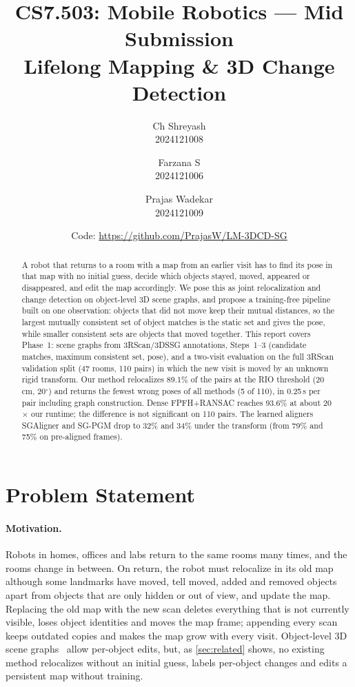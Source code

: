 \documentclass[11pt, a4paper]{article}
\title{
  \large\textnormal{CS7.503: Mobile Robotics --- Mid Submission}\\[0.5em]
  \LARGE\textbf{\color{darkblue}Lifelong Mapping \& 3D Change Detection}
}
\author{
  Ch Shreyash \\ 2024121008
  \and
  Farzana S \\ 2024121006
  \and
  Prajas Wadekar \\ 2024121009
}
\date{\small Code: \url{https://github.com/PrajasW/LM-3DCD-SG}}
\begin{document}
\maketitle

\begin{abstract}
  \noindent A robot that returns to a room with a map from an earlier visit has to find its pose in that map with no
  initial guess, decide which objects stayed, moved, appeared or disappeared, and edit the map accordingly. We pose this
  as joint relocalization and change detection on object-level 3D scene graphs, and propose a training-free pipeline
  built on one observation: objects that did not move keep their mutual distances, so the largest mutually consistent
  set of object matches is the static set and gives the pose, while smaller consistent sets are objects that moved
  together. This report covers Phase~1: scene graphs from 3RScan/3DSSG annotations, Steps~1--3 (candidate matches,
  maximum consistent set, pose), and a two-visit evaluation on the full 3RScan validation split (47 rooms, 110 pairs)
  in which the new visit is moved by an unknown rigid transform. Our method relocalizes 89.1\% of the pairs at the RIO
  threshold (20\,cm, 20$^\circ$) and returns the fewest wrong poses of all methods (5 of 110), in 0.25\,s per pair
  including graph construction. Dense FPFH+RANSAC reaches 93.6\% at about 20$\times$ our runtime; the difference is not
  significant on 110 pairs. The learned aligners SGAligner and SG-PGM drop to 32\% and 34\% under the transform
  (from 79\% and 75\% on pre-aligned frames).
\end{abstract}

\section{Problem Statement}\label{sec:problem}

\paragraph{Motivation.} Robots in homes, offices and labs return to the same rooms many times, and the rooms change in
between. On return, the robot must relocalize in its old map although some landmarks have moved, tell moved, added and
removed objects apart from objects that are only hidden or out of view, and update the map. Replacing the old map with
the new scan deletes everything that is not currently visible, loses object identities and moves the map frame;
appending every scan keeps outdated copies and makes the map grow with every visit. Object-level 3D scene
graphs~\cite{rosinol2021kimera,wald2020learning} allow per-object edits, but, as \cref{sec:related} shows, no existing
method relocalizes without an initial guess, labels per-object changes and edits a persistent map without training.
\end{document}
